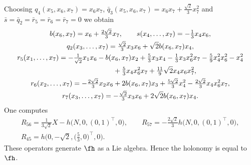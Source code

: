 \begin{Example} Choosing $q_4(x_5,x_6,x_7)=x_6 x_7$, $\bar q_3(x_5,x_6,x_7)=x_6 x_7+\frac {\sqrt2}3 x_7^2$ and $\bar s=\bar q_2=\bar r_5 =\bar r_6 =\bar r_7=0$ we obtain
\begin{gather*}
b(x_6,x_7) = x_6+\tfrac{2\sqrt2}3 x_7,\qquad
s(x_4,\dots,x_7)= -\tfrac13 x_4x_6,\\
q_2(x_3,\dots,x_7)= \tfrac{ \sqrt2}3 x_3 x_6 +\sqrt2 b(x_6,x_7)x_4 ,\\
r_5(x_1,\dots,x_7)= -\tfrac1{\sqrt2} x_1 x_6-b(x_6 ,x_7)x_2 +\tfrac 53 x_3 x_4 -\tfrac 13 x_3 x_6^2 x_7-\tfrac59 x_4^2 x_6^2 -x_4^2 \\
\hphantom{r_5(x_1,\dots,x_7)=}{} +\tfrac 53 x_4 x_6^2 x_7 +\tfrac {11}9 \sqrt2 x_4 x_6 x_7^2,\\
r_6(x_2,\dots,x_7)= -\tfrac{2\sqrt2}3x_2 x_6 +2b(x_6, x_7)x_3 +\tfrac {5\sqrt2}3 x_4^2 -\tfrac{2\sqrt2}3x_4 x_6^2 x_7, \\
r_7(x_3,\dots,x_7)= -\tfrac{\sqrt2}3 x_3 x_6 +2\sqrt2 b(x_6, x_7) x_4.
\end{gather*}
One computes
\begin{gather*} R_{56}=\tfrac 1{3\sqrt2} X-h\big(N,0,(0,1)^\top,0\big),\qquad R_{57}=-\tfrac{2\sqrt2}3 h\big(N,0,(0,1)^\top,0\big),\\ R_{45}=h\big(0,-\sqrt2,\big(\tfrac53,0\big)^\top,0\big). \end{gather*}
These operators generate $\fh$ as a Lie algebra. Hence the holonomy is equal to $\fh$.
\end{Example}

